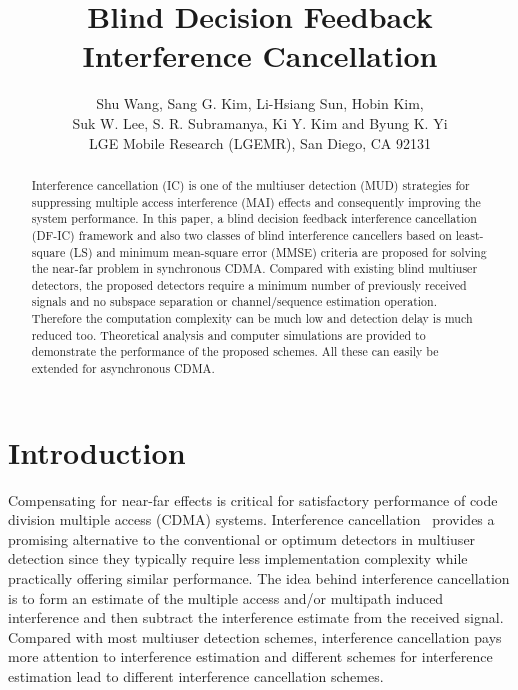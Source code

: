 \documentclass[a4paper,10pt,fleqn, twocolumn]{IEEETran}
\title{Blind Decision Feedback Interference Cancellation}
\author{Shu Wang, Sang G. Kim, Li-Hsiang Sun, Hobin Kim,\\
   Suk W. Lee, S. R. Subramanya, Ki Y. Kim and Byung K. Yi\\ LGE Mobile Research (LGEMR), San Diego, CA 92131}
\date{}
\begin{document}
\maketitle
\begin{abstract}\small
Interference cancellation (IC) is one of the multiuser detection
(MUD) strategies for suppressing multiple access interference
(MAI) effects and consequently improving the system performance.
In this paper, a blind decision feedback interference cancellation (DF-IC) framework and
also two classes of blind interference cancellers based on least-square (LS)
and minimum mean-square error (MMSE) criteria are proposed for
solving the near-far problem in synchronous CDMA. Compared
with existing blind multiuser detectors, the proposed detectors
require a minimum number of previously received signals and no
subspace separation or channel/sequence estimation operation.
Therefore the computation complexity can be much low and
detection delay is much reduced too. Theoretical analysis and
computer simulations are provided to demonstrate the performance
of the proposed schemes. All these can easily be extended for
asynchronous CDMA.
\end{abstract}
\section{Introduction}
Compensating for near-far effects is critical for satisfactory
performance of code division multiple access (CDMA) systems.
Interference
cancellation~\cite{Yoon93,Patel94,Wijk95,Divsalar96,Kim98,Bugallo01}
provides a promising alternative to the conventional or optimum
detectors in multiuser detection since they typically require less
implementation complexity while practically offering similar
performance. The idea behind interference cancellation is to form
an estimate of the multiple access and/or multipath induced
interference and then subtract the interference estimate from the
received signal. Compared with most multiuser detection
schemes, interference cancellation pays more attention to
interference estimation and different schemes for interference
estimation lead to different interference cancellation schemes.
\end{document}
